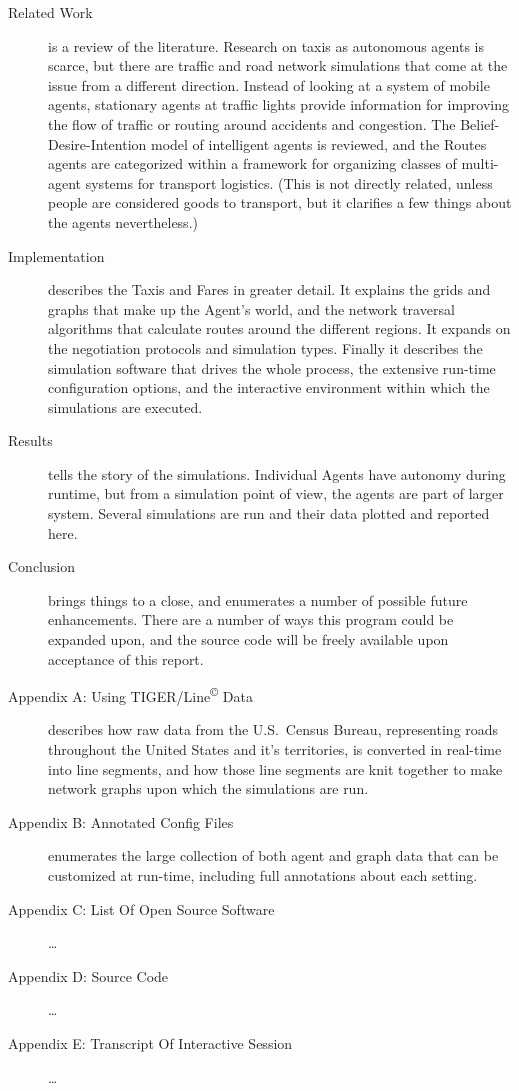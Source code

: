 \documentclass[11pt,letterpaper,onecolumn,twoside,openright,final]{report}
\begin{document}
\begin{description}
  \item[Related Work] is a review of the literature.
    Research on taxis as autonomous agents is scarce, but there are traffic and road network simulations that come at the issue from a different direction.
    Instead of looking at a system of mobile agents, stationary agents at traffic lights provide information for improving the flow of traffic or routing around accidents and congestion.
    The Belief-Desire-Intention model of intelligent agents is reviewed, and the Routes agents are categorized within a framework for organizing classes of multi-agent systems for transport logistics.
    (This is not directly related, unless people are considered goods to transport, but it clarifies a few things about the agents nevertheless.)
  \item[Implementation] describes the Taxis and Fares in greater detail.
    It explains the grids and graphs that make up the Agent's world, and the network traversal algorithms that calculate routes around the different regions.
    It expands on the negotiation protocols and simulation types.
    Finally it describes the simulation software that drives the whole process, the extensive run-time configuration options, and the interactive environment within which the simulations are executed.
  \item[Results] tells the story of the simulations.
    Individual Agents have autonomy during runtime, but from a simulation point of view, the agents are part of larger system.
    Several simulations are run and their data plotted and reported here.
  \item[Conclusion] brings things to a close, and enumerates a number of possible future enhancements.
    There are a number of ways this program could be expanded upon, and the source code will be freely available upon acceptance of this report.
  \item[Appendix A: Using TIGER/Line\textsuperscript{\scriptsize{\copyright}} Data] describes how raw data from the U.S.~Census Bureau, representing roads throughout the United States and it's territories, is converted in real-time into line segments, and how those line segments are knit together to make network graphs upon which the simulations are run.
  \item[Appendix B: Annotated Config Files] enumerates the large collection of both agent and graph data that can be customized at run-time, including full annotations about each setting.
  \item[Appendix C: List Of Open Source Software]\ldots
  \item[Appendix D: Source Code]\ldots
  \item[Appendix E: Transcript Of Interactive Session]\ldots
\end{description}
\end{document}
